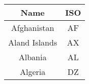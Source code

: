 \begin{tabular}{|c|c|}
\hline
Name & ISO \\
\hline
Afghanistan & AF \\
Aland Islands & AX \\
Albania    &AL  \\
Algeria   &DZ \\
\hline
\end{tabular}
